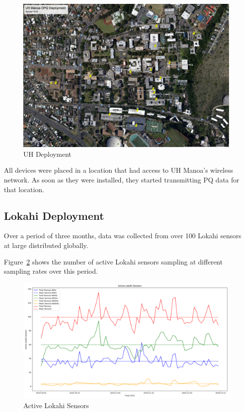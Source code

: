 \begin{figure}[H]
	\centering
	\includegraphics[width=\linewidth]{figures/deploy.jpg}
	\caption{UH Deployment}
	\label{fig:UhDeploy}
\end{figure}

All devices were placed in a location that had access to UH Manoa's wireless network. As soon as they were installed, they started transmitting PQ data for that location.

\subsection{Lokahi Deployment}\label{subsec:lokahi-deployment}

Over a period of three months, data was collected from over 100 Lokahi sensors at large distributed globally.

Figure~\ref{fig:active_lokahi_sensors_i} shows the number of active Lokahi sensors sampling at different sampling rates over this period.

\begin{figure}[H]
	\centering
	\includegraphics[width=\linewidth]{figures/lokahi_num_sensors.png}
	\caption{Active Lokahi Sensors}
	\label{fig:active_lokahi_sensors_i}
\end{figure}

